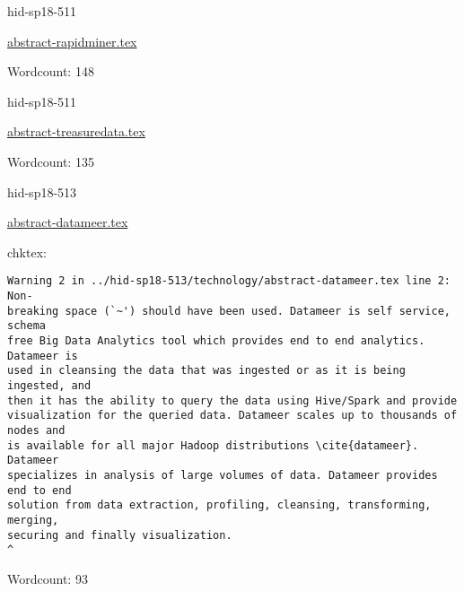 

\begin{IU}

hid-sp18-511

\href{https://github.com/cloudmesh-community/hid-sp18-511/blob/master//technology/abstract-rapidminer.tex}{abstract-rapidminer.tex}

 

Wordcount: 148

\end{IU}



\begin{IU}

hid-sp18-511

\href{https://github.com/cloudmesh-community/hid-sp18-511/blob/master//technology/abstract-treasuredata.tex}{abstract-treasuredata.tex}

 

Wordcount: 135

\end{IU}



\begin{IU}

hid-sp18-513

\href{https://github.com/cloudmesh-community/hid-sp18-513/blob/master//technology/abstract-datameer.tex}{abstract-datameer.tex}

 
chktex:
\begin{tiny}
\begin{verbatim}
Warning 2 in ../hid-sp18-513/technology/abstract-datameer.tex line 2: Non-
breaking space (`~') should have been used. Datameer is self service, schema
free Big Data Analytics tool which provides end to end analytics. Datameer is
used in cleansing the data that was ingested or as it is being ingested, and
then it has the ability to query the data using Hive/Spark and provide
visualization for the queried data. Datameer scales up to thousands of nodes and
is available for all major Hadoop distributions \cite{datameer}. Datameer
specializes in analysis of large volumes of data. Datameer provides end to end
solution from data extraction, profiling, cleansing, transforming, merging,
securing and finally visualization.
^
\end{verbatim}
\end{tiny}

Wordcount: 93

\end{IU}

